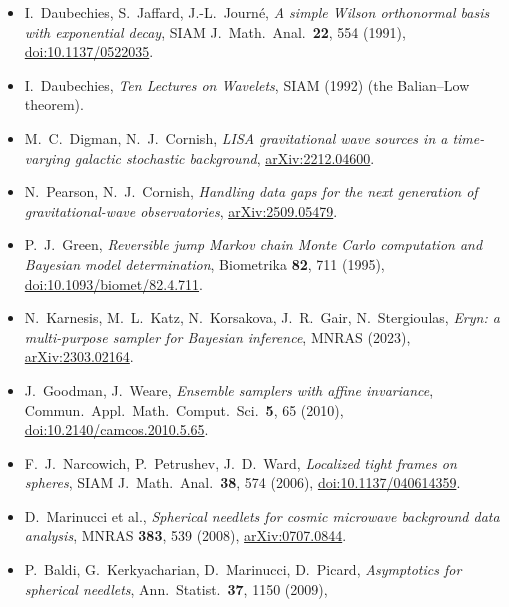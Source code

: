 \documentclass[11pt,a4paper]{article}
\begin{document}
\begin{itemize}
{        Wilson-Daubechies time-frequency transform}, J.\ Phys.\ Conf.\ Ser.\
        \textbf{363}, 012032 (2012),
        \href{https://doi.org/10.1088/1742-6596/363/1/012032}{doi:10.1088/1742-6596/363/1/012032}.
  \item I.~Daubechies, S.~Jaffard, J.-L.~Journ\'e, \emph{A simple Wilson orthonormal
        basis with exponential decay}, SIAM J.\ Math.\ Anal.\ \textbf{22}, 554 (1991),
        \href{https://doi.org/10.1137/0522035}{doi:10.1137/0522035}.
  \item I.~Daubechies, \emph{Ten Lectures on Wavelets}, SIAM (1992) (the Balian--Low
        theorem).
  \item M.~C.~Digman, N.~J.~Cornish, \emph{LISA gravitational wave sources in a
        time-varying galactic stochastic background},
        \href{https://arxiv.org/abs/2212.04600}{arXiv:2212.04600}.
  \item N.~Pearson, N.~J.~Cornish, \emph{Handling data gaps for the next generation of
        gravitational-wave observatories},
        \href{https://arxiv.org/abs/2509.05479}{arXiv:2509.05479}.
  \item P.~J.~Green, \emph{Reversible jump Markov chain Monte Carlo computation and
        Bayesian model determination}, Biometrika \textbf{82}, 711 (1995),
        \href{https://doi.org/10.1093/biomet/82.4.711}{doi:10.1093/biomet/82.4.711}.
  \item N.~Karnesis, M.~L.~Katz, N.~Korsakova, J.~R.~Gair, N.~Stergioulas,
        \emph{Eryn: a multi-purpose sampler for Bayesian inference}, MNRAS (2023),
        \href{https://arxiv.org/abs/2303.02164}{arXiv:2303.02164}.
  \item J.~Goodman, J.~Weare, \emph{Ensemble samplers with affine invariance}, Commun.\
        Appl.\ Math.\ Comput.\ Sci.\ \textbf{5}, 65 (2010),
        \href{https://doi.org/10.2140/camcos.2010.5.65}{doi:10.2140/camcos.2010.5.65}.
  \item F.~J.~Narcowich, P.~Petrushev, J.~D.~Ward, \emph{Localized tight frames on
        spheres}, SIAM J.\ Math.\ Anal.\ \textbf{38}, 574 (2006),
        \href{https://doi.org/10.1137/040614359}{doi:10.1137/040614359}.
  \item D.~Marinucci et al., \emph{Spherical needlets for cosmic microwave background
        data analysis}, MNRAS \textbf{383}, 539 (2008),
        \href{https://arxiv.org/abs/0707.0844}{arXiv:0707.0844}.
  \item P.~Baldi, G.~Kerkyacharian, D.~Marinucci, D.~Picard, \emph{Asymptotics for
        spherical needlets}, Ann.\ Statist.\ \textbf{37}, 1150 (2009),

\end{itemize}
\end{document}
